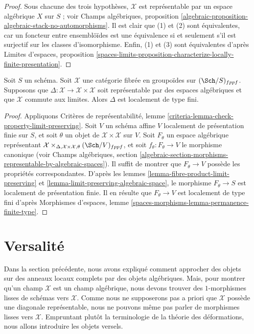 \begin{proof}
Sous chacune des trois hypothèses, $\mathcal{X}$ est représentable par un
espace algébrique $X$ sur $S$ ; voir Champs algébriques, proposition
\ref{algebraic-proposition-algebraic-stack-no-automorphisms}. Il est clair que
(1) et (2) sont équivalentes, car un foncteur entre ensemblöïdes est une
équivalence si et seulement s'il est surjectif sur les classes d'isomorphisme.
Enfin, (1) et (3) sont équivalentes d'après Limites d'espaces, proposition
\ref{spaces-limits-proposition-characterize-locally-finite-presentation}.
\end{proof}

\begin{lemma}
\label{lemma-diagonal}
Soit $S$ un schéma. Soit $\mathcal{X}$ une catégorie fibrée en groupoïdes sur
$(\Sch/S)_{fppf}$. Supposons que
$\Delta : \mathcal{X} \to \mathcal{X} \times \mathcal{X}$ soit représentable
par des espaces algébriques et que $\mathcal{X}$ commute aux limites. Alors
$\Delta$ est localement de type fini.
\end{lemma}

\begin{proof}
Appliquons Critères de représentabilité, lemme
\ref{criteria-lemma-check-property-limit-preserving}. Soit $V$ un schéma
affine $V$ localement de présentation finie sur $S$, et soit $\theta$ un objet
de $\mathcal{X} \times \mathcal{X}$ sur $V$. Soit $F_\theta$ un espace
algébrique représentant
$\mathcal{X} \times_{\Delta, \mathcal{X} \times \mathcal{X}, \theta}
(\Sch/V)_{fppf}$, et soit $f_\theta : F_\theta \to V$ le morphisme canonique
(voir Champs algébriques, section
\ref{algebraic-section-morphisms-representable-by-algebraic-spaces}). Il
suffit de montrer que $F_\theta \to V$ possède les propriétés correspondantes.
D'après les lemmes \ref{lemma-fibre-product-limit-preserving} et
\ref{lemma-limit-preserving-algebraic-space}, le morphisme
$F_\theta \to S$ est localement de présentation finie. Il en résulte que
$F_\theta \to V$ est localement de type fini d'après Morphismes d'espaces,
lemme \ref{spaces-morphisms-lemma-permanence-finite-type}.
\end{proof}






\section{Versalité}
\label{section-versality}

\noindent
Dans la section précédente, nous avons expliqué comment approcher des objets
sur des anneaux locaux complets par des objets algébriques. Mais, pour montrer
qu'un champ $\mathcal{X}$ est un champ algébrique, nous devons trouver des
$1$-morphismes lisses de schémas vers $\mathcal{X}$. Comme nous ne supposerons
pas a priori que $\mathcal{X}$ possède une diagonale représentable, nous ne
pouvons même pas parler de morphismes lisses vers $\mathcal{X}$. Empruntant
plutôt la terminologie de la théorie des déformations, nous allons introduire
les objets versels.

